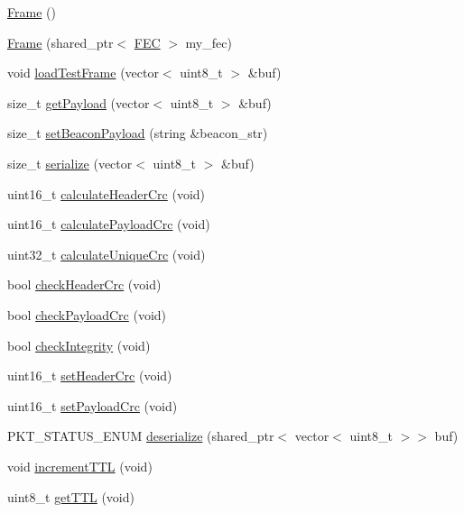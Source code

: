 \begin{DoxyCompactItemize}
\item 
\hyperlink{classFrame_ad2e5946cf41d4817e750500acf05d02b}{Frame} ()
\item 
\hyperlink{classFrame_a230b093686859a8d614b81b19f0433a0}{Frame} (shared\+\_\+ptr$<$ \hyperlink{classFEC}{F\+EC} $>$ my\+\_\+fec)
\item 
void \hyperlink{classFrame_ae0082da89627bc112701735227104eec}{load\+Test\+Frame} (vector$<$ uint8\+\_\+t $>$ \&buf)
\item 
size\+\_\+t \hyperlink{classFrame_a57812c04330da0044155af6e2ca9a6a7}{get\+Payload} (vector$<$ uint8\+\_\+t $>$ \&buf)
\item 
size\+\_\+t \hyperlink{classFrame_a950b26a59c2f2716662a09964e5d95d1}{set\+Beacon\+Payload} (string \&beacon\+\_\+str)
\item 
size\+\_\+t \hyperlink{classFrame_a8c202575665982edb827d04d2c2b705c}{serialize} (vector$<$ uint8\+\_\+t $>$ \&buf)
\item 
uint16\+\_\+t \hyperlink{classFrame_a3e45887a93b6173b1c56bde945524e8c}{calculate\+Header\+Crc} (void)
\item 
uint16\+\_\+t \hyperlink{classFrame_adbb695fdefa7b4c464620b0048016b0a}{calculate\+Payload\+Crc} (void)
\item 
uint32\+\_\+t \hyperlink{classFrame_a0fe074218aa4420b0706eb699c7f7172}{calculate\+Unique\+Crc} (void)
\item 
bool \hyperlink{classFrame_a34b08e2484da3872ea9e4de67d22be3e}{check\+Header\+Crc} (void)
\item 
bool \hyperlink{classFrame_ae073ad6b06c8eb7073b390474e869224}{check\+Payload\+Crc} (void)
\item 
bool \hyperlink{classFrame_ac7d53c381360cbcddf3f11ef89281c32}{check\+Integrity} (void)
\item 
uint16\+\_\+t \hyperlink{classFrame_a28beb1dcca5f9f385a10dddab7e4ce21}{set\+Header\+Crc} (void)
\item 
uint16\+\_\+t \hyperlink{classFrame_a4d4af8b70c703f5e8f9869fb157f9af1}{set\+Payload\+Crc} (void)
\item 
P\+K\+T\+\_\+\+S\+T\+A\+T\+U\+S\+\_\+\+E\+N\+UM \hyperlink{classFrame_ab60c3b088b1ef6b52944fa1f4b5ae51a}{deserialize} (shared\+\_\+ptr$<$ vector$<$ uint8\+\_\+t $>$$>$ buf)
\item 
void \hyperlink{classFrame_a46139e40aaadc65459f1d094e6f7fc20}{increment\+T\+TL} (void)
\item 
uint8\+\_\+t \hyperlink{classFrame_a383e2fb65096f4c57f37b48d3d74f07d}{get\+T\+TL} (void)
$$
\end{DoxyCompactItemize}
